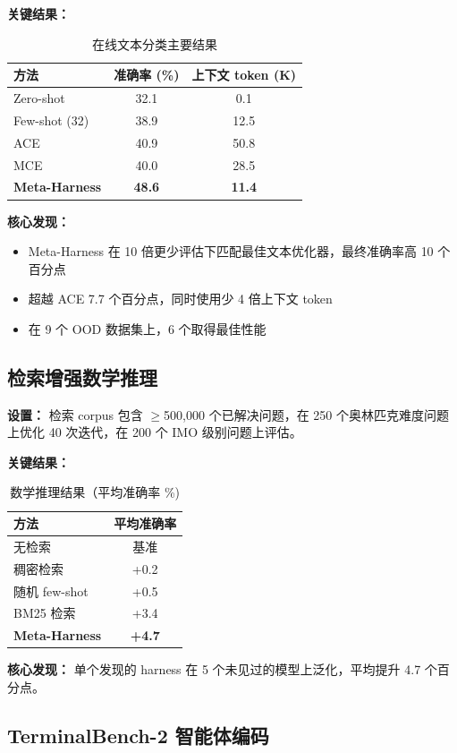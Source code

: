\documentclass[12pt,a4paper]{article}
\begin{document}
\textbf{关键结果：}
\begin{table}[h]
\centering
\caption{在线文本分类主要结果}
\begin{tabular}{lcc}
\toprule
方法 & 准确率 (\%) & 上下文 token (K) \\
\midrule
Zero-shot & 32.1 & 0.1 \\
Few-shot (32) & 38.9 & 12.5 \\
ACE & 40.9 & 50.8 \\
MCE & 40.0 & 28.5 \\
\textbf{Meta-Harness} & \textbf{48.6} & \textbf{11.4} \\
\bottomrule
\end{tabular}
\end{table}

\textbf{核心发现：}
\begin{itemize}
    \item Meta-Harness 在 10 倍更少评估下匹配最佳文本优化器，最终准确率高 10 个百分点
    \item 超越 ACE 7.7 个百分点，同时使用少 4 倍上下文 token
    \item 在 9 个 OOD 数据集上，6 个取得最佳性能
\end{itemize}

\subsection{检索增强数学推理}

\textbf{设置：} 检索 corpus 包含 $\geq$500,000 个已解决问题，在 250 个奥林匹克难度问题上优化 40 次迭代，在 200 个 IMO 级别问题上评估。

\textbf{关键结果：}
\begin{table}[h]
\centering
\caption{数学推理结果（平均准确率 \%) }
\begin{tabular}{lc}
\toprule
方法 & 平均准确率 \\
\midrule
无检索 & 基准 \\
稠密检索 & +0.2 \\
随机 few-shot & +0.5 \\
BM25 检索 & +3.4 \\
\textbf{Meta-Harness} & \textbf{+4.7} \\
\bottomrule
\end{tabular}
\end{table}

\textbf{核心发现：} 单个发现的 harness 在 5 个未见过的模型上泛化，平均提升 4.7 个百分点。

\subsection{TerminalBench-2 智能体编码}
\end{document}
